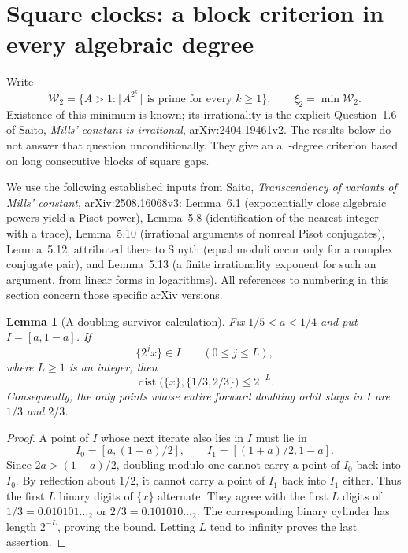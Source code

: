 \documentclass[11pt,a4paper]{article}
\newtheorem{lemma}[theorem]{Lemma}
\theoremstyle{definition}
\theoremstyle{remark}
\numberwithin{equation}{section}
\begin{document}
\section{Square clocks: a block criterion in every algebraic degree}

Write
\[
 \mathcal W_2=\{A>1:\lfloor A^{2^k}\rfloor\text{ is prime for every }k\ge1\},
 \qquad \xi_2=\min\mathcal W_2.
\]
Existence of this minimum is known; its irrationality is the explicit
Question~1.6 of Saito, \emph{Mills' constant is irrational},
arXiv:2404.19461v2. The results below do not answer that question
unconditionally. They give an all-degree criterion based on long consecutive blocks of
square gaps.

We use the following established inputs from Saito,
\emph{Transcendency of variants of Mills' constant},
arXiv:2508.16068v3: Lemma~6.1 (exponentially close algebraic powers
yield a Pisot power), Lemma~5.8 (identification of the nearest integer
with a trace), Lemma~5.10 (irrational arguments of nonreal Pisot
conjugates), Lemma~5.12, attributed there to Smyth (equal moduli occur
only for a complex conjugate pair), and Lemma~5.13 (a finite
irrationality exponent for such an argument, from linear forms in
logarithms). All references to numbering in this section concern
those specific arXiv versions.

\begin{lemma}[A doubling survivor calculation]\label{mil:sq-survivor}
Fix $1/5<a<1/4$ and put $I=[a,1-a]$. If
\[
 \{2^j x\}\in I\qquad(0\le j\le L),
\]
where $L\ge1$ is an integer, then
\[
 \operatorname{dist}\bigl(\{x\},\{1/3,2/3\}\bigr)\le2^{-L}.
\]
Consequently, the only points whose entire forward doubling orbit
stays in $I$ are $1/3$ and $2/3$.
\end{lemma}
\begin{proof}
A point of $I$ whose next iterate also lies in $I$ must lie in
\[
 I_0=[a,(1-a)/2],\qquad I_1=[(1+a)/2,1-a].
\]
Since $2a>(1-a)/2$, doubling modulo one cannot carry a point of
$I_0$ back into $I_0$. By reflection about $1/2$, it cannot carry
a point of $I_1$ back into $I_1$ either. Thus the first $L$ binary
digits of $\{x\}$ alternate. They agree with the first $L$ digits
of $1/3=0.010101\ldots{}_2$ or $2/3=0.101010\ldots{}_2$.
The corresponding binary cylinder has length $2^{-L}$, proving
the bound. Letting $L$ tend to infinity proves the last assertion.
\end{proof}
\end{document}
